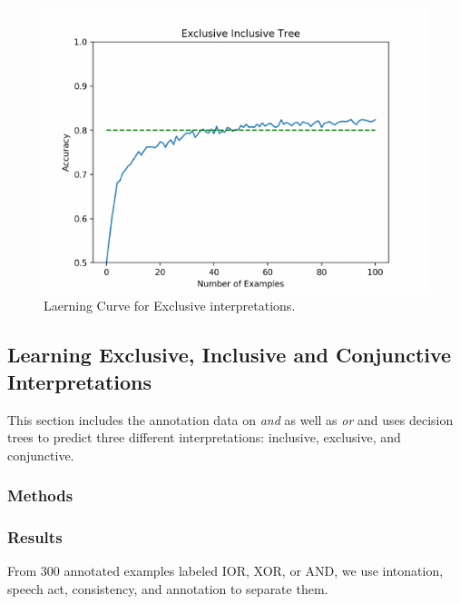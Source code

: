 \documentclass[oneside]{report}
\theoremstyle{definition}
\theoremstyle{definition}
\theoremstyle{definition}
\theoremstyle{remark}
\begin{document}
\begin{figure}[tb]

{\centering \includegraphics{figs/exorLearning-1} 

}

\caption{Laerning Curve for Exclusive interpretations.}\label{fig:exorLearning}
\end{figure}
\subsection{Learning Exclusive, Inclusive and Conjunctive
Interpretations}\label{learning-exclusive-inclusive-and-conjunctive-interpretations}

This section includes the annotation data on \emph{and} as well as
\emph{or} and uses decision trees to predict three different
interpretations: inclusive, exclusive, and conjunctive.

\subsubsection{Methods}\label{methods-5}

\subsubsection{Results}\label{results-5}

From 300 annotated examples labeled IOR, XOR, or AND, we use intonation,
speech act, consistency, and annotation to separate them. \newline
\end{document}

